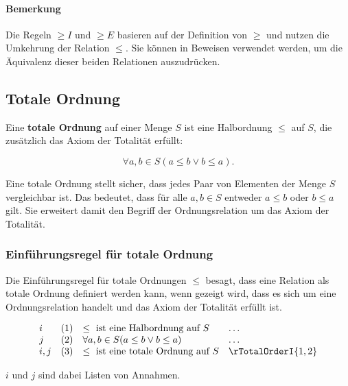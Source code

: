 \documentclass[main.tex]{subfiles}
\begin{document}
\paragraph{Bemerkung}

Die Regeln \(\geq I\) und \(\geq E\) basieren auf der Definition von \(\geq\) und nutzen die Umkehrung der Relation \(\leq\). Sie können in Beweisen verwendet werden, um die Äquivalenz dieser beiden Relationen auszudrücken.

\subsection{Totale Ordnung}

\begin{definition}
    Eine \textbf{totale Ordnung} auf einer Menge \(S\) ist eine Halbordnung \(\leq\) auf \(S\), die zusätzlich das Axiom der Totalität erfüllt:
    
    \[
    \forall a, b \in S (a \leq b \lor b \leq a).
    \]
\end{definition}

\begin{remark}
    Eine totale Ordnung stellt sicher, dass jedes Paar von Elementen der Menge \(S\) vergleichbar ist. Das bedeutet, dass für alle \(a, b \in S\) entweder \(a \leq b\) oder \(b \leq a\) gilt. Sie erweitert damit den Begriff der Ordnungsrelation um das Axiom der Totalität.
\end{remark}

\subsubsection*{Einführungsregel für totale Ordnung}
\label{rule:rTotalOrderI}
Die Einführungsregel für totale Ordnungen \(\leq\) besagt, dass eine Relation als totale Ordnung definiert werden kann, wenn gezeigt wird, dass es sich um eine Ordnungsrelation handelt und das Axiom der Totalität erfüllt ist.

\[
\begin{array}{llll}
    i       & (1) & \leq \text{ ist eine Halbordnung auf } S & \dots \\
    j       & (2) & \forall a, b \in S (a \leq b \lor b \leq a) & \dots \\
    i,j     & (3) & \leq \text{ ist eine totale Ordnung auf } S & \rTotalOrderI{1,2}
\end{array}
\]

\(i\) und \(j\) sind dabei Listen von Annahmen.
\end{document}
